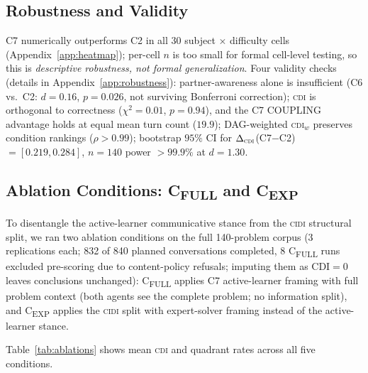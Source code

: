 \documentclass{article}
\newcommand{\CDI}{\textsc{cdi}}
\newcommand{\CIDI}{\textsc{cidi}}
\begin{document}
\subsection{Robustness and Validity}
\label{sec:robustness}

C7 numerically outperforms C2 in all 30 subject $\times$ difficulty cells
(Appendix~\ref{app:heatmap}); per-cell $n$ is too small for formal
cell-level testing, so this is \emph{descriptive robustness, not formal
generalization}.
Four validity checks (details in Appendix~\ref{app:robustness}):
partner-awareness alone is insufficient (C6 vs.\ C2: $d=0.16$,
$p=0.026$, not surviving Bonferroni correction);
\CDI{} is orthogonal to correctness ($\chi^2=0.01$, $p=0.94$),
and the C7 COUPLING advantage holds at equal mean turn count ($19.9$);
DAG-weighted \CDI$_w$ preserves condition rankings ($\rho>0.99$);
bootstrap $95\%$ CI for $\Delta_{\CDI}$(C7$-$C2) $= [0.219, 0.284]$,
$n=140$ power $>99.9\%$ at $d=1.30$.

\subsection{Ablation Conditions: C\textsubscript{FULL} and C\textsubscript{EXP}}
\label{sec:ablations}

To disentangle the active-learner communicative stance from the \CIDI{}
structural split, we ran two ablation conditions on the full 140-problem
corpus (3 replications each; 832 of 840 planned conversations completed,
8 C\textsubscript{FULL} runs excluded pre-scoring due to content-policy refusals;
imputing them as CDI$=0$ leaves conclusions unchanged):
C\textsubscript{FULL} applies C7 active-learner framing with
full problem context (both agents see the complete problem; no information
split), and C\textsubscript{EXP} applies the \CIDI{} split with
expert-solver framing instead of the active-learner stance.

Table~\ref{tab:ablations} shows mean \CDI{} and quadrant rates across
all five conditions.
\end{document}
